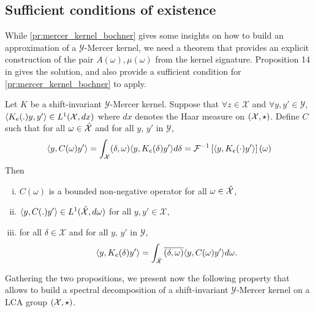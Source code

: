 \subsection{Sufficient conditions of existence}
While \cref{pr:mercer_kernel_bochner} gives some insights on how to build an approximation of a $\mathcal{Y}$-Mercer kernel, we need a theorem that provides an explicit construction of the pair $A(\omega), \mu(\omega)$ from the kernel signature. Proposition 14 in \citet{Carmeli2010} gives the solution, and also provide a sufficient condition for \cref{pr:mercer_kernel_bochner} to apply.
\begin{proposition}
\label{pr:inverse_ovk_Fourier_decomposition}
Let $K$ be a shift-invariant $\mathcal{Y}$-Mercer kernel. %
Suppose that $\forall z \in \mathcal{X}$ and $\forall y ,y' \in\mathcal{Y}$, $\langle K_e(.)y,y'\rangle\in L^1(\mathcal{X},dx)$ where $dx$ denotes the Haar measure on $(\mathcal{X}, \star)$. %
Define $C$ such that for all $\omega \in \hat{\mathcal{X}}$ and for all $y$, $y'$ in $\mathcal{Y}$,
\begin{dmath}\label{eq:CK0}
\inner{y,C(\omega)y'} = \int_{\mathcal{X}} \pairing{\delta, \omega}\inner{y, K_e(\delta)y'}d\delta =\IFT{\inner{y, K_e(\cdot)y'}}(\omega)
\end{dmath}
Then
\begin{enumerate}[i)]
\item $C(\omega)$ is a bounded non-negative operator for all $\omega \in \hat{\mathcal{X}}$,
\item $\langle y, C(.)y'\rangle\in L^1(\hat{\mathcal{X}},d\omega)$ for all $y,y'\in\mathcal{X}$,
\item for all $\delta\in\mathcal{X}$ and for all $y$, $y'$ in $\mathcal{Y}$,
\begin{dmath*}
\inner{y, K_e(\delta)y'}= \int_{\dual{\mathcal{X}}}\conj{\pairing{\delta,\omega}}\inner{y, C(\omega)y'}d\omega.
\end{dmath*}
\end{enumerate}
\end{proposition}
Gathering the two propositions, we present now the following property that allows to build a spectral decomposition of a shift-invariant $\mathcal{Y}$-Mercer kernel on a \acs{LCA} group $(\mathcal{X},\star)$.
